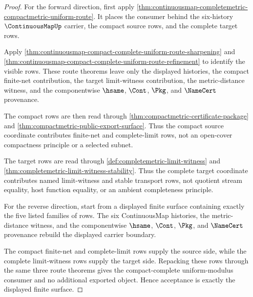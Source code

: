 \begin{proof}
For the forward direction, first apply
\autoref{thm:continuousmap-completemetric-compactmetric-uniform-route}. It
places the consumer behind the six-history $\ContinuousMapUp$ carrier, the
compact source rows, and the complete target rows.

Apply
\autoref{thm:continuousmap-compact-complete-uniform-route-sharpening} and
\autoref{thm:continuousmap-compact-complete-uniform-route-refinement} to
identify the visible rows. These route theorems leave only the displayed
histories, the compact finite-net contribution, the target limit-witness
contribution, the metric-distance witness, and the componentwise $\hsame$,
$\Cont$, $\Pkg$, and $\NameCert$ provenance.

The compact rows are then read through
\autoref{thm:compactmetric-certificate-package} and
\autoref{thm:compactmetric-public-export-surface}. Thus the compact source
coordinate contributes finite-net and complete-limit rows, not an open-cover
compactness principle or a selected subnet.

The target rows are read through
\autoref{def:completemetric-limit-witness} and
\autoref{thm:completemetric-limit-witness-stability}. Thus the complete
target coordinate contributes named limit-witness and stable transport rows,
not quotient stream equality, host function equality, or an ambient
completeness principle.

For the reverse direction, start from a displayed finite surface containing
exactly the five listed families of rows. The six ContinuousMap histories,
the metric-distance witness, and the componentwise $\hsame$, $\Cont$, $\Pkg$,
and $\NameCert$ provenance rebuild the displayed carrier boundary.

The compact finite-net and complete-limit rows supply the source side, while
the complete limit-witness rows supply the target side. Repacking these rows
through the same three route theorems gives the compact-complete
uniform-modulus consumer and no additional exported object. Hence acceptance
is exactly the displayed finite surface.
\end{proof}

